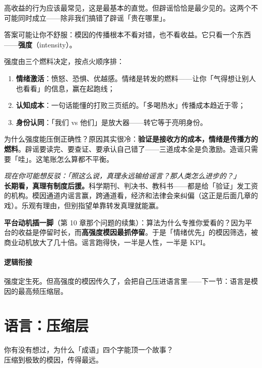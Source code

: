 \documentclass[../../main2.tex]{subfiles}
\begin{document}
高收益的行为应该最常见，这是最基本的直觉。但辟谣恰恰是最少见的。这两个不可能同时成立——除非我们搞错了辟谣「贵在哪里」。

答案可能让你不舒服：模因的传播根本不看对错，也不看收益。它只看一个东西——\textbf{强度}（intensity）。

强度由三个燃料决定，按点火顺序排：

\begin{enumerate}
	\item \textbf{情绪激活}：愤怒、恐惧、优越感。情绪是转发的燃料——让你「气得想让别人也看看」的信息，赢在起跑线；
	\item \textbf{认知成本}：一句话能懂的打败三页纸的。「多喝热水」传播成本趋近于零；
	\item \textbf{身份认同}：「我们 vs 他们」是放大器——转它等于亮明身份。
\end{enumerate}

为什么强度能压倒正确性？原因其实很冷：\textbf{验证是接收方的成本，情绪是传播方的燃料}。辟谣要读完、要查证、要承认自己错了——三道成本全是负激励。造谣只需要「哇」。这笔账怎么算都不平衡。

\begin{questionbox}
	\textit{现在你可能想反驳：「照这么说，真理永远输给谣言？那人类怎么进步的？」}\\
	\textbf{长期看，真理有制度后援。}科学期刊、判决书、教科书——都是给「验证」发工资的机构。模因通道内谣言赢，跨通道看，经济和法律会来纠偏（这正是后面几章的戏）。乐观有理由，但别指望单靠转发真理就能赢。
\end{questionbox}

\begin{warningbox}
	\textbf{平台动机插一脚}（第 10 章那个问题的续集）：算法为什么专推你爱看的？因为平台的收益是停留时长，而\textbf{高强度模因最抓停留}。于是「情绪优先」的模因筛选，被商业动机放大了几十倍。谣言跑得快，一半是人性，一半是 KPI。
\end{warningbox}

\paragraph*{逻辑衔接}
	强度定生死。但高强度的模因传久了，会把自己压进语言里——下一节：语言是模因的最高频压缩层。

\section{语言：压缩层}

\begin{readingnote}
	你有没有想过，为什么「成语」四个字能顶一个故事？\\
	压缩到极致的模因，传得最远。
\end{readingnote}
\end{document}
